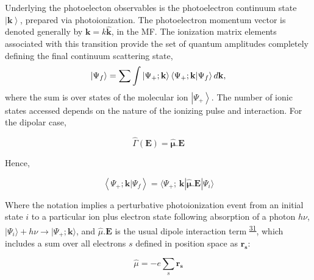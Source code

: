 \documentclass[10pt]{article}
\begin{document}
Underlying the photoelecton observables is the photoelectron continuum state $\left|\mathbf{k}\right>$, prepared via photoionization.
The photoelectron momentum vector is denoted generally by $\boldsymbol{\mathbf{k}}=k\mathbf{\hat{k}}$, in the MF. %
The ionization matrix elements associated with this transition %
provide the set of quantum amplitudes completely defining the final continuum scattering state,
\begin{equation}
\left|\Psi_f\right> = \sum{\int{\left|\Psi_{+};\bf{k}\right>\left<\Psi_{+};\mathbf{k}|\Psi_f\right> d\bf{k}}},
\label{eq:cstate}
\end{equation}
where the sum is over states of the molecular ion $\left|\Psi_{+}\right>$. The number of ionic states accessed depends on the nature of the ionizing pulse and interaction. For the dipolar case,

\begin{equation}
\hat{\Gamma}(\boldsymbol{\mathbf{E}}) = \hat{\mathbf{\mu}}.\boldsymbol{\mathbf{E}}
\end{equation}

Hence,

\begin{equation}
\left<\Psi_{+};\mathbf{k}|\Psi_f\right> =\langle\Psi_{+};\,\mathbf{k}|\hat{\mathbf{\mu}}.\boldsymbol{\mathbf{E}}|\Psi_{i}\rangle
\label{eq:matE-dipole}
\end{equation}

Where the notation implies a perturbative photoionization event from an initial state $i$ to a particular ion plus electron state following absorption of a photon $h\nu$, %
$|\Psi_{i}\rangle+h\nu{\rightarrow}|\Psi_{+};\boldsymbol{\mathbf{k}}\rangle$, and $\hat{\mu}.\boldsymbol{\mathbf{E}}$ is the usual dipole interaction term \textsuperscript{\hyperref[csl:31]{31}}, which includes a sum over all electrons $s$ defined in position space as $\mathbf{r_{s}}$:  

\begin{equation}
\hat{\mu}=-e\sum_{s}\mathbf{r_{s}}
\label{eq:dipole-operator}
\end{equation}
\end{document}

